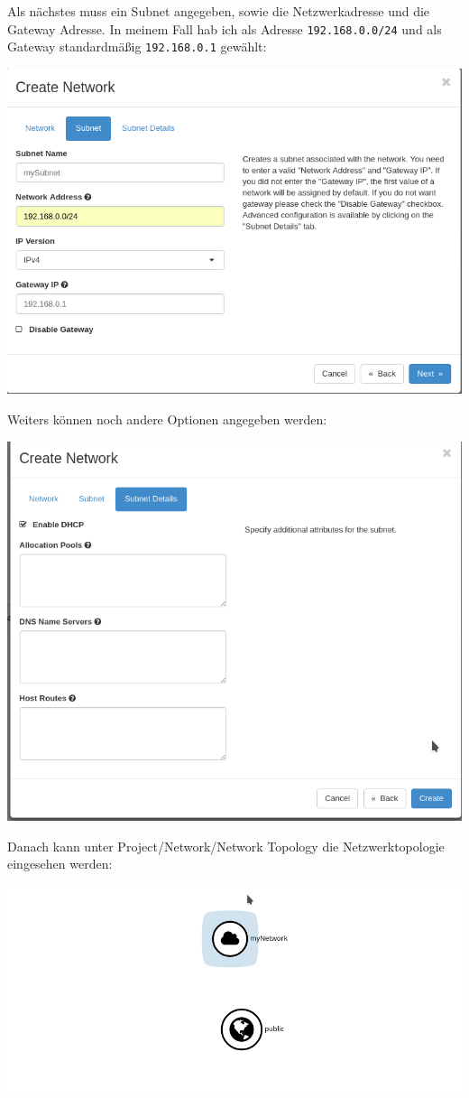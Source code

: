 Als nächstes muss ein Subnet angegeben, sowie die Netzwerkadresse und die Gateway Adresse. In meinem Fall hab ich als Adresse \verb|192.168.0.0/24| und als Gateway standardmäßig \verb|192.168.0.1| gewählt:

\begin{minipage}{\linewidth}
	\centering
	\includegraphics[width=.8\linewidth]{images/networksubnet}
\end{minipage}

Weiters können noch andere Optionen angegeben werden:

\begin{minipage}{\linewidth}
	\centering
	\includegraphics[width=.8\linewidth]{images/networkextra}
\end{minipage}

Danach kann unter Project/Network/Network Topology die Netzwerktopologie eingesehen werden:

\begin{minipage}{\linewidth}
	\centering
	\includegraphics[width=.8\linewidth]{images/topologie}
\end{minipage}

